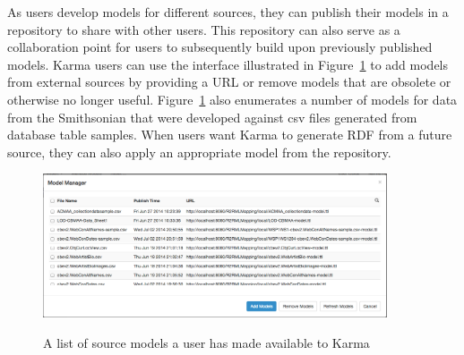 As users develop models for different sources, they can publish their models in a repository to share with other users.  
This repository can also serve as a collaboration point for users to subsequently build upon previously published models.  
Karma users can use the interface illustrated in Figure~\ref{fig:model-manager-screenshot} to add models from external sources by providing a URL or remove models that are obsolete or otherwise no longer useful.  
Figure~\ref{fig:model-manager-screenshot} also enumerates a number of models for data from the Smithsonian that were developed against csv files generated from database table samples.  
When users want Karma to generate RDF from a future source, they can also apply an appropriate model from the repository.

\begin{figure}
\begin{center}
\includegraphics[width=4.0in]{3-model-manager.png}
\vspace{-3mm}
\caption{A list of source models a user has made available to Karma}
\vspace{-2mm}
\label{fig:model-manager-screenshot}
\end{center}
\vspace{-1.5em}
\end{figure}

